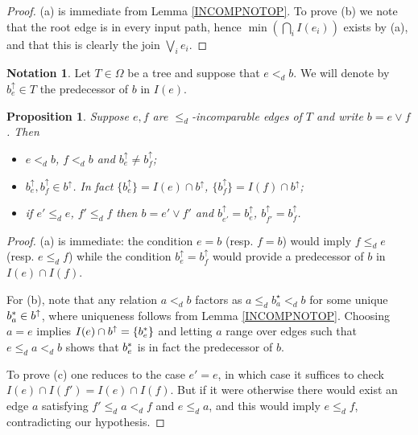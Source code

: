 \documentclass[a4paper,10pt
,draft
]{article}%
\numberwithin{equation}{section}
\numberwithin{figure}{section}
\newtheorem{proposition}[equation]{Proposition}%
\theoremstyle{definition} %
\newtheorem{notation}[equation]{Notation}%
\newcommand{\1}{\ensuremath{\mathbbm 1}}%
\begin{document}
\begin{proof}
	(a) is immediate from Lemma \ref{INCOMPNOTOP}.
        To prove (b) we note that
        the root edge is in every input path, hence
	$\min (\bigcap_{i} I(e_i))$ exists by (a), and that this is clearly the join $\bigvee_i {e_i}$.
\end{proof}


\begin{notation}
	Let $T \in \Omega$ be a tree and suppose that $e <_d b$. We will denote by $b^{\uparrow}_e \in T$ the predecessor of $b$ in $I(e)$.
\end{notation}


\begin{proposition}\label{INPUTPREDECESSORPROP PROP}
Suppose $e,f$ are $\leq_d$-incomparable edges of $T$ and write $b= e \vee f$. Then
\begin{itemize}
\item [(a)] $e <_d b$, $f<_d b$ and $b^{\uparrow}_e \neq b^{\uparrow}_f$;
\item [(b)] $b^{\uparrow}_e, b^{\uparrow}_f \in b^{\uparrow}$. In fact $\{b^{\uparrow}_e\} = I(e) \cap b^{\uparrow}$,
$\{b^{\uparrow}_f\} = I(f) \cap b^{\uparrow}$;
\item[(c)] if $e' \leq_d e$, $f' \leq_d f$ then 
$b = e' \vee f'$ and $b^{\uparrow}_{e'} = b^{\uparrow}_{e}$, $b^{\uparrow}_{f'} = b^{\uparrow}_{f}$.
\end{itemize}
\end{proposition}


\begin{proof}
(a) is immediate: the condition $e = b$ (resp. $f = b$) would imply $f \leq_d e$ (resp. $e \leq_d f$)
while the condition $b^{\uparrow}_e = b^{\uparrow}_f$ would provide a predecessor of $b$ in $I(e) \cap I(f)$. 

For (b), note that any relation $a <_d b$ factors as 
$a \leq_d b^{\star}_a <_d b$ for some unique $b^{\**}_a \in b^{\uparrow}$, where uniqueness follows from Lemma \ref{INCOMPNOTOP}. Choosing $a=e$ implies $I(e) \cap b^{\uparrow} = \{b^{\**}_e\}$ and letting $a$ range over edges such that $e \leq_d a <_d b$ shows that $b^{\**}_e$ is in fact the predecessor of $b$.

To prove (c) one reduces to the case $e'=e$, in which case it suffices to check $I(e) \cap I(f') = I(e) \cap I(f)$. But if it were otherwise there would exist an edge $a$ satisfying
$f' \leq_d a <_d f$ and $e \leq_d a$, and this would imply $e \leq_d f$, contradicting our hypothesis.
\end{proof}
\end{document}
